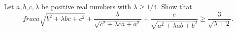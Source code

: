Let $a,b,c,\lambda$ be positive real numbers with $\lambda\geq 1/4$. Show that
$$frac{a}{\sqrt{b^2+\lambda bc+c^2}} + \frac{b}{\sqrt{c^2+\lambda ca+a^2}}
+ \frac{c}{\sqrt{a^2+\lambda ab+b^2}}\geq \frac{3}{\sqrt{\lambda+2}}.$$
